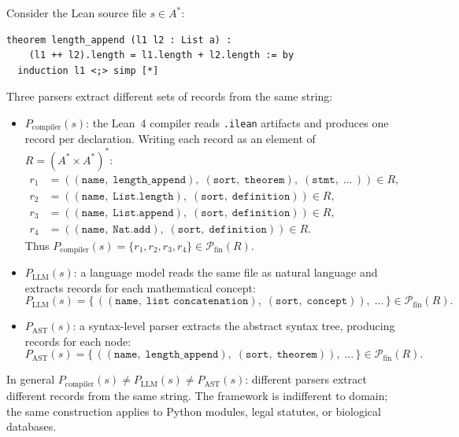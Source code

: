 \begin{example}
Consider the Lean source file $s \in A^*$:
\begin{verbatim}
theorem length_append (l1 l2 : List a) :
    (l1 ++ l2).length = l1.length + l2.length := by
  induction l1 <;> simp [*]
\end{verbatim}
\noindent Three parsers extract different sets of records from the same string:
\begin{itemize}
\item $P_{\mathrm{compiler}}(s)$: the Lean~4 compiler reads \texttt{.ilean} artifacts and produces one record per declaration. Writing each record as an element of $R = (A^* \times A^*)^*$:
\begin{align*}
r_1 &= ((\texttt{name},\; \texttt{length\_append}),\; (\texttt{sort},\; \texttt{theorem}),\; (\texttt{stmt},\; \ldots\,)) \in R, \\
r_2 &= ((\texttt{name},\; \texttt{List.length}),\; (\texttt{sort},\; \texttt{definition})) \in R, \\
r_3 &= ((\texttt{name},\; \texttt{List.append}),\; (\texttt{sort},\; \texttt{definition})) \in R, \\
r_4 &= ((\texttt{name},\; \texttt{Nat.add}),\; (\texttt{sort},\; \texttt{definition})) \in R.
\end{align*}
Thus $P_{\mathrm{compiler}}(s) = \{r_1, r_2, r_3, r_4\} \in \mathcal{P}_{\mathrm{fin}}(R)$.

\item $P_{\mathrm{LLM}}(s)$: a language model reads the same file as natural language and extracts records for each mathematical concept:
\[
P_{\mathrm{LLM}}(s) = \bigl\{\,
((\texttt{name},\; \texttt{list concatenation}),\; (\texttt{sort},\; \texttt{concept})),\;\ldots
\,\bigr\} \in \mathcal{P}_{\mathrm{fin}}(R).
\]

\item $P_{\mathrm{AST}}(s)$: a syntax-level parser extracts the abstract syntax tree, producing records for each node:
\[
P_{\mathrm{AST}}(s) = \bigl\{\,
((\texttt{name},\; \texttt{length\_append}),\; (\texttt{sort},\; \texttt{theorem})),\;\ldots
\,\bigr\} \in \mathcal{P}_{\mathrm{fin}}(R).
\]
\end{itemize}
\noindent In general $P_{\mathrm{compiler}}(s) \neq P_{\mathrm{LLM}}(s) \neq P_{\mathrm{AST}}(s)$: different parsers extract different records from the same string. The framework is indifferent to domain; the same construction applies to Python modules, legal statutes, or biological databases.
\end{example}

